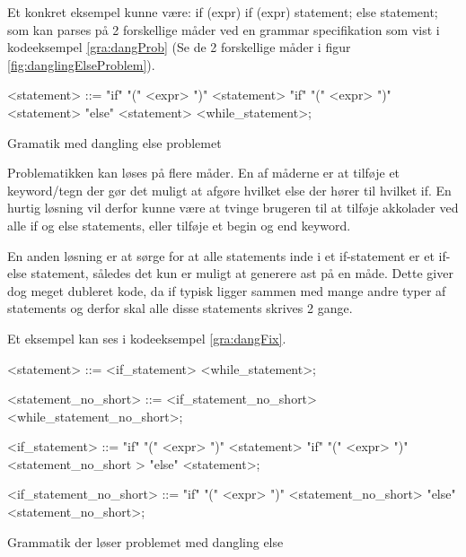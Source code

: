 Et konkret eksempel kunne være: if (expr) if (expr) statement; else statement; som kan parses på 2 forskellige måder ved en grammar specifikation som vist i kodeeksempel \ref{gra:dangProb} (Se de 2 forskellige måder i figur \ref{fig:danglingElseProblem}).

\begin{Grammar}
 \begin{grammar}
    <statement> ::= "if" "(" <expr> ")" <statement> 
    \alt "if" "(" <expr> ")" <statement> "else" <statement>
    \alt <while\_statement>;
 \end{grammar}
 \caption{Gramatik med dangling else problemet}\label{gra:dangProb}
\end{Grammar}


\noindent Problematikken kan løses på flere måder. En af måderne er at tilføje et keyword/tegn der gør det muligt at afgøre hvilket else der hører til hvilket if. En hurtig løsning vil derfor kunne være at tvinge brugeren til at tilføje akkolader ved alle if og else statements, eller tilføje et begin og end keyword.

\noindent En anden løsning er at sørge for at alle statements inde i et if-statement er et if-else statement, således det kun er muligt at generere \gls{ast} på en måde. Dette giver dog meget dubleret kode, da if typisk ligger sammen med mange andre typer af statements og derfor skal alle disse statements skrives 2 gange.

\noindent Et eksempel kan ses i kodeeksempel \ref{gra:dangFix}.

\begin{Grammar}
 \begin{grammar}
    <statement> ::= <if\_statement>
    \alt <while\_statement>;
    
    <statement\_no\_short> ::= <if\_statement\_no\_short>
    \alt <while\_statement\_no\_short>;
    
    <if\_statement> ::= "if" "(" <expr> ")" <statement> 
    \alt"if" "(" <expr> ")" <statement\_no\_short > "else" <statement>;
    
    <if\_statement\_no\_short> ::= "if" "(" <expr> ")" <statement\_no\_short> "else" <statement\_no\_short>;
 \end{grammar}
 \caption{Grammatik der løser problemet med dangling else}\label{gra:dangFix}
\end{Grammar}

